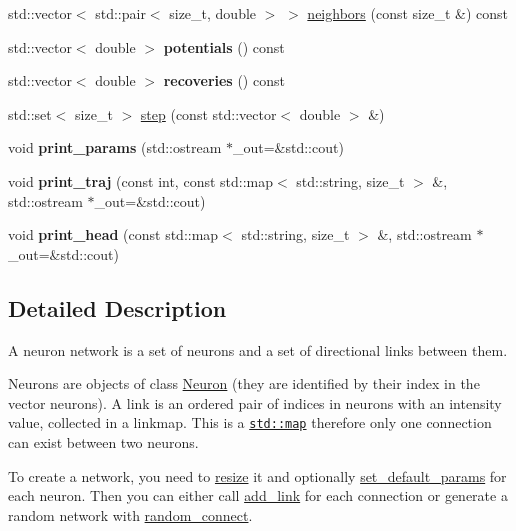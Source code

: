 \begin{DoxyCompactItemize}
\item 
std\+::vector$<$ std\+::pair$<$ size\+\_\+t, double $>$ $>$ \hyperlink{classNetwork_a98bbf44b077ba1bec5a62ecffc405503}{neighbors} (const size\+\_\+t \&) const
\item 
\mbox{\label{classNetwork_a44d9c341bfec26cb37efe3c29fd7a103}} 
std\+::vector$<$ double $>$ {\bfseries potentials} () const
\item 
\mbox{\label{classNetwork_a2e9dbb815c622cccdd50186ae8c9f4a7}} 
std\+::vector$<$ double $>$ {\bfseries recoveries} () const
\item 
std\+::set$<$ size\+\_\+t $>$ \hyperlink{classNetwork_a53665a3a69e6ec894c313d0ce3fb7f34}{step} (const std\+::vector$<$ double $>$ \&)
\item 
\mbox{\label{classNetwork_afc43116eb2429aeec0f3c6a54d252142}} 
void {\bfseries print\+\_\+params} (std\+::ostream $\ast$\+\_\+out=\&std\+::cout)
\item 
\mbox{\label{classNetwork_ae460d31557bba058fdf66e4fe5feb801}} 
void {\bfseries print\+\_\+traj} (const int, const std\+::map$<$ std\+::string, size\+\_\+t $>$ \&, std\+::ostream $\ast$\+\_\+out=\&std\+::cout)
\item 
\mbox{\label{classNetwork_ab572dd33cb91d9f0aae89c4477809d26}} 
void {\bfseries print\+\_\+head} (const std\+::map$<$ std\+::string, size\+\_\+t $>$ \&, std\+::ostream $\ast$\+\_\+out=\&std\+::cout)
\end{DoxyCompactItemize}


\subsection{Detailed Description}
A neuron network is a set of neurons and a set of directional links between them.

Neurons are objects of class \hyperlink{classNeuron}{Neuron} (they are identified by their index in the vector neurons). A link is an ordered pair of indices in neurons with an intensity value, collected in a linkmap. This is a \href{https://en.cppreference.com/w/cpp/container/map}{\tt std\+::map} therefore only one connection can exist between two neurons.

To create a network, you need to \hyperlink{classNetwork_ae9d6a1913ae92e1d2d7cd17f70f815b5}{resize} it and optionally \hyperlink{classNetwork_ad1d20020028425cfab199da1942172c9}{set\+\_\+default\+\_\+params} for each neuron. Then you can either call \hyperlink{classNetwork_a6ebe0899329973e4924997a25e205856}{add\+\_\+link} for each connection or generate a random network with \hyperlink{classNetwork_a4c751a78c7bc5e27c6b36df78c9c70c0}{random\+\_\+connect}.

